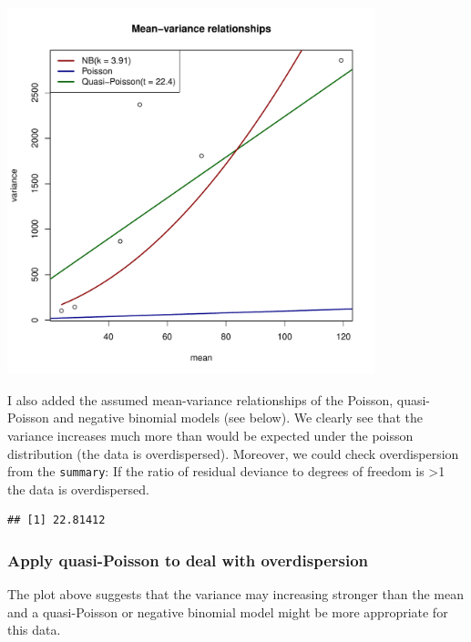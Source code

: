 \begin{knitrout}
{\centering \includegraphics[width=0.8\textwidth]{appendix/usetheglm/two/mod_count_meanvar-1} 

}



\end{knitrout}

I also added the assumed mean-variance relationships of the Poisson, quasi-Poisson and negative binomial models (see below).
We clearly see that the variance increases much more than would be expected under the poisson distribution (the data is overdispersed).
Moreover, we could check overdispersion from the \texttt{summary}:
If the ratio of residual deviance to degrees of freedom is \textgreater 1 the data is overdispersed.
\begin{knitrout}
\color{fgcolor}\small\begin{kframe}
\begin{alltt}
\hlopt{$} \hlopt{/} \hlopt{$}
\end{alltt}
\begin{verbatim}
## [1] 22.81412
\end{verbatim}
\end{kframe}
\end{knitrout}




\subsubsection{Apply quasi-Poisson to deal with overdispersion}
The plot above suggests that the variance may increasing stronger than the mean and a quasi-Poisson or negative binomial model might be more appropriate for this data.

